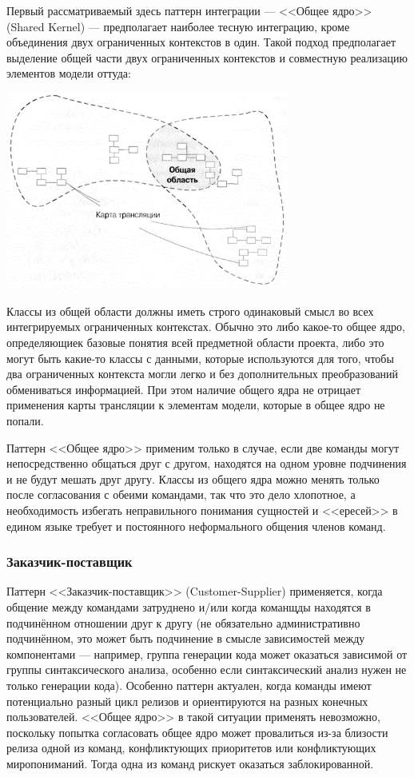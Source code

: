 \documentclass{../../text-style}
\begin{document}
Первый рассматриваемый здесь паттерн интеграции --- <<Общее ядро>> (Shared Kernel) --- предполагает наиболее тесную интеграцию, кроме объединения двух ограниченных контекстов в один. Такой подход предполагает выделение общей части двух ограниченных контекстов и совместную реализацию элементов модели оттуда:

\begin{center}
    \includegraphics[width=0.7\textwidth]{sharedKernel.png}
\end{center}

Классы из общей области должны иметь строго одинаковый смысл во всех интегрируемых ограниченных контекстах. Обычно это либо какое-то общее ядро, определяющиек базовые понятия всей предметной области проекта, либо это могут быть какие-то классы с данными, которые используются для того, чтобы два ограниченных контекста могли легко и без дополнительных преобразований обмениваться информацией. При этом наличие общего ядра не отрицает применения карты трансляции к элементам модели, которые в общее ядро не попали.

Паттерн <<Общее ядро>> применим только в случае, если две команды могут непосредственно общаться друг с другом, находятся на одном уровне подчинения и не будут мешать друг другу. Классы из общего ядра можно менять только после согласования с обеими командами, так что это дело хлопотное, а необходимость избегать неправильного понимания сущностей и <<ересей>> в едином языке требует и постоянного неформального общения членов команд.

\subsubsection{Заказчик-поставщик}

Паттерн <<Заказчик-поставщик>> (Customer-Supplier) применяется, когда общение между командами затруднено и/или когда команщды находятся в подчинённом отношении друг к другу (не обязательно административно подчинённом, это может быть подчинение в смысле зависимостей между компонентами --- например, группа генерации кода может оказаться зависимой от группы синтаксического анализа, особенно если синтаксический анализ нужен не только генерации кода). Особенно паттерн актуален, когда команды имеют потенциально разный цикл релизов и ориентируются на разных конечных пользователей. <<Общее ядро>> в такой ситуации применять невозможно, поскольку попытка согласовать общее ядро может провалиться из-за близости релиза одной из команд, конфликтующих приоритетов или конфликтующих миропониманий. Тогда одна из команд рискует оказаться заблокированной.
\end{document}
